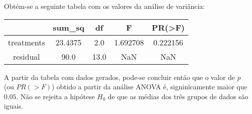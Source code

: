 Obtém-se a seguinte tabela com os valores da análise de variância:
\\

\begin{table}[ht]
    \centering
    \begin{tabular}{c|c|c|c|c}
        \hline
        \rowcolor{pagecolor!50!COLOR1}
                   & sum\_sq & df   & F        & PR(\textgreater{}F) \\ \hline
        treatments & 23.4375 & 2.0  & 1.692708 & 0.222156            \\ \hline
        residual   & 90.0    & 13.0 & NaN      & NaN                 \\ \hline
    \end{tabular}
\end{table}

A partir da tabela com dados gerados, pode-se concluir então que o valor de $p$ (ou $PR(>F)$) obtido a partir da análise ANOVA é, signinicamente maior que $0.05$. Não se rejeita a hipótese $H_0$ de que as médias dos três grupos de dados são iguais.